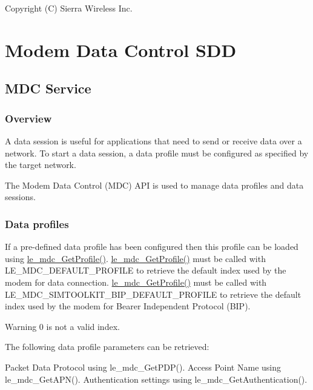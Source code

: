 Copyright (C) Sierra Wireless Inc. \hypertarget{c_SDD_mdc}{}\section{Modem Data Control S\+DD}\label{c_SDD_mdc}
\hypertarget{c_SDD_mdc_mdc_service}{}\subsection{M\+D\+C Service}\label{c_SDD_mdc_mdc_service}
\hypertarget{c_SDD_mdc_Overview}{}\subsubsection{Overview}\label{c_SDD_mdc_Overview}
A data session is useful for applications that need to send or receive data over a network. To start a data session, a data profile must be configured as specified by the target network.

The Modem Data Control (M\+DC) A\+PI is used to manage data profiles and data sessions.\hypertarget{c_SDD_mdc_mdc_dataProfile}{}\subsubsection{Data profiles}\label{c_SDD_mdc_mdc_dataProfile}
If a pre-\/defined data profile has been configured then this profile can be loaded using \hyperlink{le__mdc__interface_8h_a638b693cd5f644fa5c24f81e1e36483c}{le\+\_\+mdc\+\_\+\+Get\+Profile()}. \hyperlink{le__mdc__interface_8h_a638b693cd5f644fa5c24f81e1e36483c}{le\+\_\+mdc\+\_\+\+Get\+Profile()} must be called with L\+E\+\_\+\+M\+D\+C\+\_\+\+D\+E\+F\+A\+U\+L\+T\+\_\+\+P\+R\+O\+F\+I\+LE to retrieve the default index used by the modem for data connection. \hyperlink{le__mdc__interface_8h_a638b693cd5f644fa5c24f81e1e36483c}{le\+\_\+mdc\+\_\+\+Get\+Profile()} must be called with L\+E\+\_\+\+M\+D\+C\+\_\+\+S\+I\+M\+T\+O\+O\+L\+K\+I\+T\+\_\+\+B\+I\+P\+\_\+\+D\+E\+F\+A\+U\+L\+T\+\_\+\+P\+R\+O\+F\+I\+LE to retrieve the default index used by the modem for Bearer Independent Protocol (B\+IP).

\begin{DoxyWarning}{Warning}
0 is not a valid index.
\end{DoxyWarning}
The following data profile parameters can be retrieved\+: \begin{DoxyVerb}Packet Data Protocol using le_mdc_GetPDP().
Access Point Name using le_mdc_GetAPN().
Authentication settings using le_mdc_GetAuthentication().
\end{DoxyVerb}



